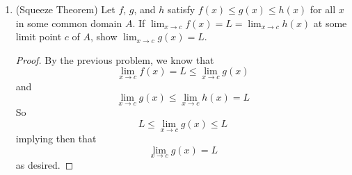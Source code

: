 \begin{enumerate}
    \item (Squeeze Theorem) Let \( f \), \( g \), and \( h \) satisfy \( f(x) \leq g(x) \leq h(x) \) for all \( x \) in some common domain \( A \). If \( \lim_{x\rightarrow c} f(x) = L = \lim_{x \rightarrow c} h(x) \) at some limit point \( c \) of \( A \), show \( \lim_{x \rightarrow c} g(x) = L \). 
    
    \begin{proof}
    By the previous problem, we know that
    \[
    \lim_{x \rightarrow c} f(x) = L \leq \lim_{x \rightarrow c} g(x)
    \]
    and
    \[
    \lim_{x \rightarrow c} g(x) \leq \lim_{x \rightarrow c} h(x) = L
    \]
    So 
    \[
    L \leq \lim_{x \rightarrow c} g(x) \leq L
    \]
    implying then that
    \[
    \lim_{x \rightarrow c} g(x) = L
    \]
    as desired.
    \end{proof}
\end{enumerate}